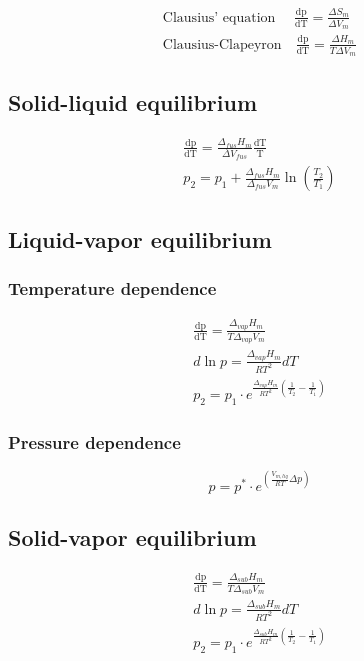 \documentclass[Master.tex]{subfiles}
\begin{document}
\begin{multicols}{2}
				   \begin{gather*}
						    \text{Clausius' equation } \quad \frac{\mathrm{dp}}{\mathrm{dT}} = \frac{\Delta S_{m}}{\Delta V_{m}}\\
						    \text{Clausius-Clapeyron} \quad \frac{\mathrm{dp}}{\mathrm{dT}} = \frac{\Delta H_{m}}{T \Delta V_{m}}
				   \end{gather*}
				   \subsection{Solid-liquid equilibrium}
						    \begin{gather*}
								     \frac{\mathrm{dp}}{\mathrm{dT}} = \frac{\Delta_{fus}  H_{m} }{\Delta V_{fus} } \frac{\mathrm{dT}}{\mathrm{T}} \\
								     p_2 = p_1 + \frac{\Delta_{fus}  H_{m} }{\Delta_{fus}  V_{m}  } \ln \left( \frac{T_2}{T_1} \right)
						    \end{gather*}
				   \subsection{Liquid-vapor equilibrium}
						    \subsubsection{Temperature dependence}
								     \begin{gather*}
										      \frac{\mathrm{dp}}{\mathrm{dT}} = \frac{\Delta _{vap}H_{m}  }{T\Delta_{vap} V_{m} }\\
										      d\ln p = \frac{\Delta_{vap}H_{m}  }{RT^{2} }dT\\
										      p_{2} = p_1 \cdot e^{\frac{\Delta _{vap}H_{m}  }{RT^{2} } \left( \frac{1}{T_2}-\frac{1}{T_1}\right)}
								     \end{gather*}
						    \subsubsection{Pressure dependence}
								     \[
										      p = p^{*} \cdot e^{\left( \frac{V_{m,liq} }{RT}\Delta p\right) }
								     \]
				   \subsection{Solid-vapor equilibrium}
						    \begin{gather*}
								     \frac{\mathrm{dp}}{\mathrm{dT}} =  \frac{\Delta _{sub}H_{m}}{T\Delta_{sub}  V_{m} }   \\
								     d\ln p = \frac{\Delta_{sub}H_{m}  }{RT^{2} }dT\\
								     p_{2} = p_1 \cdot e^{\frac{\Delta _{sub}H_{m}  }{RT^{2} } \left( \frac{1}{T_2}-\frac{1}{T_1}\right)}
						    \end{gather*}

\end{multicols}
\end{document}
